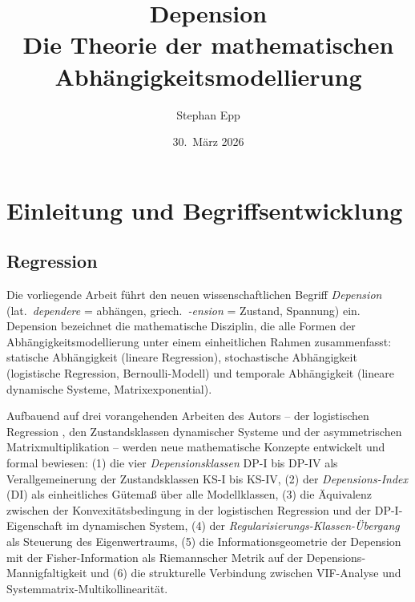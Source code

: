 ﻿\documentclass[12pt, a4paper]{article}
\title{%
  \textbf{Depension}\\
  {\Large Die Theorie der mathematischen Abhängigkeitsmodellierung}}
\author{Stephan Epp}
\date{30.\ März 2026}
\theoremstyle{definition}
\theoremstyle{remark}
\begin{document}

\maketitle
\setcounter{tocdepth}{2}
\tableofcontents
\newpage

\section{Einleitung und Begriffsentwicklung}
\label{sec:einleitung}

\subsection{Regression}
Die vorliegende Arbeit führt den neuen wissenschaftlichen Begriff \emph{Depension}
(lat.\ \emph{dependere} = abhängen, griech.\ \emph{-ension} = Zustand, Spannung) ein.
Depension bezeichnet die mathematische Disziplin, die alle Formen der
Abhängigkeitsmodellierung unter einem einheitlichen Rahmen zusammenfasst: statische
Abhängigkeit (lineare Regression), stochastische Abhängigkeit (logistische Regression,
Bernoulli-Modell) und temporale Abhängigkeit (lineare dynamische Systeme, Matrixexponential).

Aufbauend auf drei vorangehenden Arbeiten des Autors -- der logistischen Regression
\citep{epp2026logreg}, den Zustandsklassen dynamischer Systeme
\citep{epp2026sysstate} und der asymmetrischen Matrixmultiplikation
\citep{epp2026systemth} -- werden neue mathematische Konzepte entwickelt und formal
bewiesen: (1) die vier \emph{Depensionsklassen} DP-I bis DP-IV als Verallgemeinerung
der Zustandsklassen KS-I bis KS-IV, (2) der \emph{Depensions-Index} (DI) als
einheitliches Gütemaß über alle Modellklassen, (3) die Äquivalenz zwischen der
Konvexitätsbedingung in der logistischen Regression und der DP-I-Eigenschaft im
dynamischen System, (4) der \emph{Regularisierungs-Klassen-Übergang} als Steuerung
des Eigenwertraums, (5) die Informationsgeometrie der Depension mit der
Fisher-Information als Riemannscher Metrik auf der Depensions-Man\-nig\-fal\-tig\-keit
und (6) die strukturelle Verbindung zwischen VIF-Analyse und
Systemmatrix-Multikollinearität.
\end{document}
